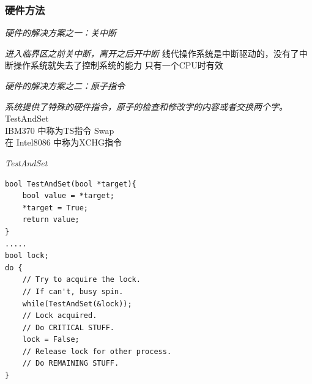 \documentclass{ctexart}
\begin{document}
\subsubsection{硬件方法}
\begin{outline}
    \1 \emph{硬件的解决方案之一：关中断}

    \emph{进入临界区之前关中断，离开之后开中断}
        \2 线代操作系统是中断驱动的，没有了中断操作系统就失去了控制系统的能力
        \2 只有一个CPU时有效

    \1 \emph{硬件的解决方案之二：原子指令}

    \emph{系统提供了特殊的硬件指令，原子的检查和修改字的内容或者交换两个字。 }
        \2 TestAndSet \\ IBM370 中称为TS指令
        \2 Swap \\ 在 Intel8086 中称为XCHG指令
    
    \1 \emph{TestAndSet}

    \begin{verbatim}
bool TestAndSet(bool *target){
    bool value = *target;
    *target = True;
    return value;
}
.....
bool lock;
do {
    // Try to acquire the lock.
    // If can't, busy spin.
    while(TestAndSet(&lock));
    // Lock acquired.
    // Do CRITICAL STUFF.
    lock = False;
    // Release lock for other process.
    // Do REMAINING STUFF.
}
    \end{verbatim}

\end{outline}
\end{document}
